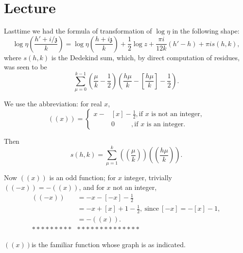 \chapter{Lecture}\label{part3:lec30} %

Last\pageoriginale time we had the formula of transformation of $\log
\eta$ in the following shape:
$$
\log \eta \left( \frac{h' + i/\mathfrak{z}}{k}\right)= \log \eta
\left( \frac{h + i \mathfrak{z}}{k}\right) + \frac{1}{2} \log z +
\frac{\pi i}{12k} (h' -h) + \pi i s(h, k),
$$
where $s(h, k)$ is the Dedekind sum, which, by direct computation of
residues, was seen to be
$$
\sum^{k-1}_{\mu=0} \left(\frac{\mu}{k} - \frac{1}{2} \right) \left(
\frac{h \mu}{k} - \left[ \frac{h \mu}{k}\right]- \frac{1}{2}\right).
$$

We use the abbreviation: for real $x$,
$$
((x)) =
\begin{cases}
  x- & [x]  - \frac{1}{2}, \text{if $x$ is not an integer,}\\
    & 0  ~~\qquad , \text{if $x$ is an integer.}
\end{cases}
$$

Then 
$$
s(h, k) = \sum^k_{\mu=1} \left( \left(\frac{\mu}{k} \right) \right)
\left( \left( \frac{h \mu}{k}\right) \right).
$$

Now $((x))$ is an odd function; for $x$ integer, trivially $((-x))=-
((x))$, and for $x$ not an integer,
\begin{align*}
  ((-x)) & = - x - [-x]- \frac{1}{2}\\
  & =- x + [x] +1- \frac{1}{2}, ~\text{since}~ [-x]=- [x] -1,\\
  & = - ((x)).\\
********* & **************
\end{align*}

$((x))$\pageoriginale is the familiar function whose graph is as
indicated. 

\begin{figure}[H]
\end{figure}

